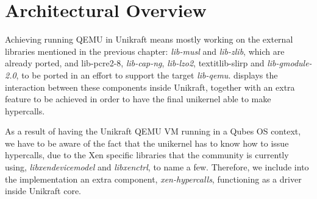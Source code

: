 \chapter{Architectural Overview}
\label{chapter:architecture}

Achieving running QEMU in Unikraft means mostly working on the external libraries mentioned in the previous chapter: \textit{lib-musl} and \textit{lib-zlib}, which are already ported, and lib-pcre2-8, \textit{lib-cap-ng}, \textit{lib-lzo2}, textit{lib-slirp} and \textit{lib-gmodule-2.0}, to be ported in an effort to support the target \textit{lib-qemu}.
 displays the interaction between these components inside Unikraft, together with an extra feature to be achieved in order to have the final unikernel able to make hypercalls.


As a result of having the Unikraft QEMU VM running in a Qubes OS context, we have to be aware of the fact that the unikernel has to know how to issue hypercalls, due to the Xen specific libraries that the community is currently using, \textit{libxendevicemodel} and \textit{libxenctrl}, to name a few.
Therefore, we include into the implementation an extra component, \textit{xen-hypercalls}, functioning as a driver inside Unikraft core.
